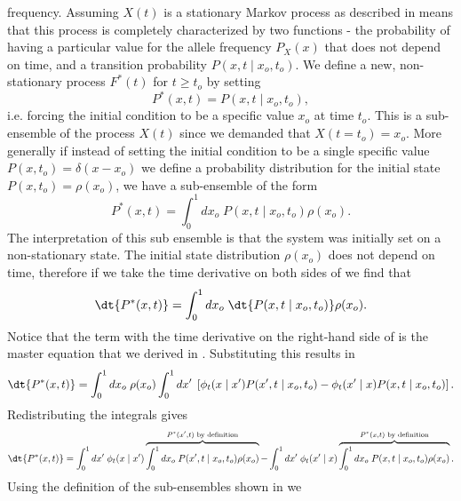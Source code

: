 frequency. Assuming $X(t)$ is a stationary Markov process as described in
 means that this process is completely
characterized by two functions - the probability of having a particular value
for the allele frequency $P_X(x)$ that does not depend on time, and a
transition probability $P(x, t \mid x_o, t_o)$. We define a new, non-stationary
process $F^*(t)$ for $t \geq t_o$ by setting
\begin{equation}
  P^*(x, t) = P(x, t\mid x_o, t_o),
\end{equation}
i.e. forcing the initial condition to be a specific value $x_o$ at time $t_o$.
This is a sub-ensemble of the process $X(t)$ since we demanded that $X(t = t_o)
= x_o$. More generally if instead of setting the initial condition to be a
single specific value $P(x, t_o) = \delta(x - x_o)$ we define a probability
distribution for the initial state $P(x, t_o) = \rho(x_o)$, we have a
sub-ensemble of the form
\begin{equation}
  P^*(x, t) = \int_0^1 dx_o \; P(x, t\mid x_o, t_o) \rho(x_o).
  \label{eq_subensemble}
\end{equation}
The interpretation of this sub ensemble is that the system was initially set on
a non-stationary state. The initial state distribution $\rho(x_o)$ does not
depend on time, therefore if we take the time derivative on both sides of
 we find that
\begin{equation}
  \dt{P^*(x, t)} = \int_0^1 dx_o \; \dt{P(x, t\mid x_o, t_o)}
                        \rho(x_o).
\label{eq_subensemble_dt}
\end{equation}
Notice that the term with the time derivative on the right-hand side of
 is the master equation that we derived in
. Substituting this results in
\begin{equation}
  \dt{P^*(x, t)} = \int_0^1 dx_o \; \rho(x_o)
  \int_0^1 dx' \;
  \left[ \phi_t(x \mid x') P(x', t \mid x_o, t_o) -
  \phi_t(x' \mid x) P(x, t \mid x_o, t_o) \right].
\end{equation}
Redistributing the integrals gives
\begin{equation}
  \dt{P^*(x, t)} = \int_0^1 dx' \; \phi_t(x \mid x')
  \overbrace{
  \int_0^1 dx_o \; P(x', t \mid x_o, t_o) \rho(x_o)}
  ^{P^*(x', t)\text{ by definition}} -
  \int_0^1 dx' \; \phi_t(x' \mid x)
  \overbrace{
  \int_0^1 dx_o \; P(x, t \mid x_o, t_o) \rho(x_o)}
  ^{P^*(x, t)\text{ by definition}}.
\end{equation}
Using the definition of the sub-ensembles shown in  we
